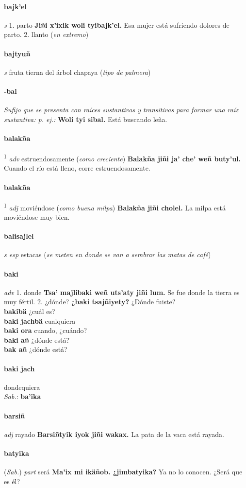 \documentclass{scrbook}
\newcommand{\entry}[1]{\paragraph{#1}}
\newcommand{\onedefinition}[1]{#1.}
\newcommand{\defsuperscript}[1]{\textsuperscript{1}}
\newcommand{\nontranslationdef}[1]{\textit{#1}}
\newcommand{\partofspeech}[1]{\textit{#1}}
\newcommand{\spanishtranslation}[1]{#1}
\newcommand{\clarification}[1]{(\textit{#1})}
\newcommand{\cholexample}[1]{\textbf{#1}}
\newcommand{\exampletranslation}[1]{#1}
\newcommand{\dialectvariant}[1]{\\\textit{#1}:}
\newcommand{\dialectword}[1]{\textbf{#1}}
\newcommand{\relevantdialect}[1]{(\textit{#1})}
\newcommand{\secondaryentry}[1]{\\\textbf{#1}}
\newcommand{\secondtranslation}[1]{#1}
\begin{document}
\begin{multicols}{2}
\entry{bajk'el}
\partofspeech{s}
\onedefinition{1}
\spanishtranslation{parto}
\cholexample{Jiñi x'ixik woli tyibajk'el.}
\exampletranslation{Esa mujer está sufriendo dolores de parto.}
\onedefinition{2}
\spanishtranslation{llanto}
\clarification{en extremo}

\entry{bajtyuñ}
\partofspeech{s}
\spanishtranslation{fruta tierna del árbol chapaya}
\clarification{tipo de palmera}

\entry{-bal}
\nontranslationdef{Sufijo que se presenta con raíces sustantivas y transitivas para formar una raíz sustantiva: p. ej.:}
\cholexample{Woli tyi sibal.}
\exampletranslation{Está buscando leña.}

\entry{balakña}
\defsuperscript{1}
\partofspeech{adv}
\spanishtranslation{estruendosamente}
\clarification{como creciente}
\cholexample{Balakña jiñi ja' che' weñ buty'ul.}
\exampletranslation{Cuando el río está lleno, corre estruendosamente.}

\entry{balakña}
\defsuperscript{2}
\partofspeech{adj}
\spanishtranslation{moviéndose}
\clarification{como buena milpa}
\cholexample{Balakña jiñi cholel.}
\exampletranslation{La milpa está moviéndose muy bien.}

\entry{balisajlel}
\partofspeech{s esp}
\spanishtranslation{estacas}
\clarification{se meten en donde se van a sembrar las matas de café}

\entry{baki}
\partofspeech{adv}
\onedefinition{1}
\spanishtranslation{donde}
\cholexample{Tsa' majlibaki weñ uts'aty jiñi lum.}
\exampletranslation{Se fue donde la tierra es muy fértil.}
\onedefinition{2}
\spanishtranslation{¿dónde?}
\cholexample{¿baki tsajñiyety?}
\exampletranslation{¿Dónde fuiste?}
\secondaryentry{bakibä}
\secondtranslation{¿cuál es?}
\secondaryentry{baki jachbä}
\secondtranslation{cualquiera}
\secondaryentry{baki ora}
\secondtranslation{cuando, ¿cuándo?}
\secondaryentry{baki añ}
\secondtranslation{¿dónde está?}
\secondaryentry{bak añ}
\secondtranslation{¿dónde está?}

\entry{baki jach}
\spanishtranslation{dondequiera}
\dialectvariant{Sab.}
\dialectword{ba'ika}

\entry{barsiñ}
\partofspeech{adj}
\spanishtranslation{rayado}
\cholexample{Barsiñtyik iyok jiñi wakax.}
\exampletranslation{La pata de la vaca está rayada.}

\entry{batyika}
\relevantdialect{Sab.}
\partofspeech{part}
\spanishtranslation{será}
\cholexample{Ma'ix mi ikäñob. ¿jimbatyika?}
\exampletranslation{Ya no lo conocen. ¿Será que es él?}


\end{multicols}
\end{document}
